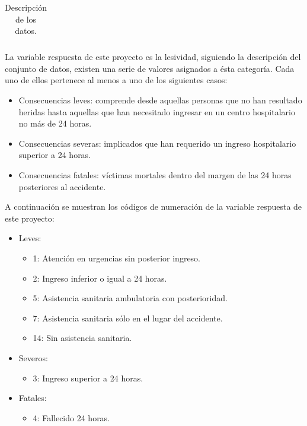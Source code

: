 \begin{enumerate}
\begin{table}[H]
\begin{tabular}{|c|L{0.7\textwidth}|}
                    \hline
                \end{tabular}
                \caption{Descripción de los datos.}
                \label{DescripcionDatosTabla}

            \end{table}


            La variable respuesta de este proyecto es la lesividad, siguiendo la descripción del conjunto de datos, existen una serie de valores asignados a ésta categoría. Cada uno de ellos pertenece al menos a uno de los siguientes casos:

              \begin{itemize}
                    \item Consecuencias leves: comprende desde aquellas personas que no han resultado heridas hasta aquellas que han necesitado ingresar en un centro hospitalario no más de 24 horas.
                    \item Consecuencias severas: implicados que han requerido un ingreso hospitalario superior a 24 horas.
                    \item Consecuencias fatales: víctimas mortales dentro del margen de las 24 horas posteriores al accidente.
                \end{itemize}


            A continuación se muestran los códigos de numeración de la variable respuesta de este proyecto:

              \begin{itemize}
                    \item Leves:
                        \begin{itemize}
                            \item 1: Atención en urgencias sin posterior ingreso.
                            \item 2: Ingreso inferior o igual a 24 horas.
                            \item 5: Asistencia sanitaria ambulatoria con posterioridad.
                            \item 7: Asistencia sanitaria sólo en el lugar del accidente.
                            \item 14: Sin asistencia sanitaria.
                        \end{itemize}
                    \item Severos:
                        \begin{itemize}
                            \item 3: Ingreso superior a 24 horas.
                        \end{itemize}
                    \item Fatales:
                        \begin{itemize}
                            \item 4: Fallecido 24 horas.
                        \end{itemize}
                \end{itemize}




\end{enumerate}
